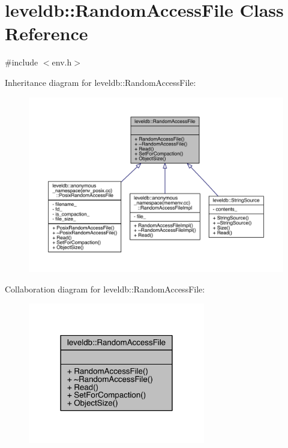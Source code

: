 \hypertarget{classleveldb_1_1_random_access_file}{}\section{leveldb\+:\+:Random\+Access\+File Class Reference}
\label{classleveldb_1_1_random_access_file}


{\ttfamily \#include $<$env.\+h$>$}



Inheritance diagram for leveldb\+:\+:Random\+Access\+File\+:
\nopagebreak
\begin{figure}[H]
\begin{center}
\leavevmode
\includegraphics[width=350pt]{classleveldb_1_1_random_access_file__inherit__graph}
\end{center}
\end{figure}


Collaboration diagram for leveldb\+:\+:Random\+Access\+File\+:\nopagebreak
\begin{figure}[H]
\begin{center}
\leavevmode
\includegraphics[width=219pt]{classleveldb_1_1_random_access_file__coll__graph}
\end{center}
\end{figure}
